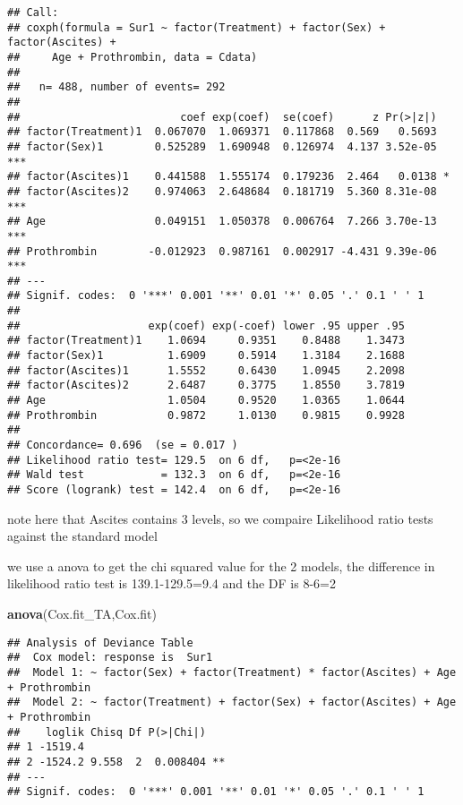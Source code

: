 \documentclass[
]{article}
\newenvironment{Shaded}{\begin{snugshade}}{\end{snugshade}}
\newcommand{\KeywordTok}[1]{\textcolor[rgb]{0.13,0.29,0.53}{\textbf{#1}}}
\newcommand{\NormalTok}[1]{#1}
\begin{document}
\begin{verbatim}
## Call:
## coxph(formula = Sur1 ~ factor(Treatment) + factor(Sex) + factor(Ascites) + 
##     Age + Prothrombin, data = Cdata)
## 
##   n= 488, number of events= 292 
## 
##                         coef exp(coef)  se(coef)      z Pr(>|z|)    
## factor(Treatment)1  0.067070  1.069371  0.117868  0.569   0.5693    
## factor(Sex)1        0.525289  1.690948  0.126974  4.137 3.52e-05 ***
## factor(Ascites)1    0.441588  1.555174  0.179236  2.464   0.0138 *  
## factor(Ascites)2    0.974063  2.648684  0.181719  5.360 8.31e-08 ***
## Age                 0.049151  1.050378  0.006764  7.266 3.70e-13 ***
## Prothrombin        -0.012923  0.987161  0.002917 -4.431 9.39e-06 ***
## ---
## Signif. codes:  0 '***' 0.001 '**' 0.01 '*' 0.05 '.' 0.1 ' ' 1
## 
##                    exp(coef) exp(-coef) lower .95 upper .95
## factor(Treatment)1    1.0694     0.9351    0.8488    1.3473
## factor(Sex)1          1.6909     0.5914    1.3184    2.1688
## factor(Ascites)1      1.5552     0.6430    1.0945    2.2098
## factor(Ascites)2      2.6487     0.3775    1.8550    3.7819
## Age                   1.0504     0.9520    1.0365    1.0644
## Prothrombin           0.9872     1.0130    0.9815    0.9928
## 
## Concordance= 0.696  (se = 0.017 )
## Likelihood ratio test= 129.5  on 6 df,   p=<2e-16
## Wald test            = 132.3  on 6 df,   p=<2e-16
## Score (logrank) test = 142.4  on 6 df,   p=<2e-16
\end{verbatim}

note here that Ascites contains 3 levels, so we compaire Likelihood
ratio tests against the standard model

we use a anova to get the chi squared value for the 2 models, the
difference in likelihood ratio test is 139.1-129.5=9.4 and the DF is
8-6=2

\begin{Shaded}
\begin{Highlighting}[]
\KeywordTok{anova}\NormalTok{(Cox.fit_TA,Cox.fit)}
\end{Highlighting}
\end{Shaded}

\begin{verbatim}
## Analysis of Deviance Table
##  Cox model: response is  Sur1
##  Model 1: ~ factor(Sex) + factor(Treatment) * factor(Ascites) + Age + Prothrombin
##  Model 2: ~ factor(Treatment) + factor(Sex) + factor(Ascites) + Age + Prothrombin
##    loglik Chisq Df P(>|Chi|)   
## 1 -1519.4                      
## 2 -1524.2 9.558  2  0.008404 **
## ---
## Signif. codes:  0 '***' 0.001 '**' 0.01 '*' 0.05 '.' 0.1 ' ' 1
\end{verbatim}
\end{document}
